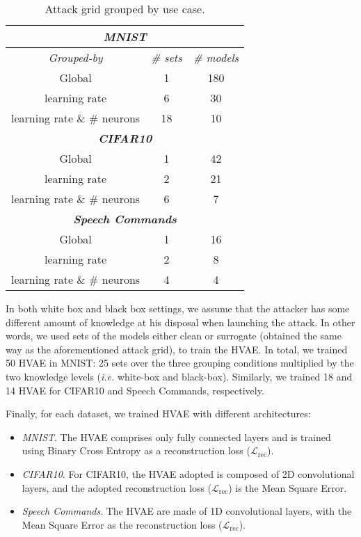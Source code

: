 \begin{table}[!htpb]
\centering
\footnotesize
\caption{Attack grid grouped by use case. }
\begin{tabular}{ccc} \toprule
\multicolumn{3}{c}{\textit{\textbf{MNIST}}} \\ \midrule
    \textit{Grouped-by} & \textit{\# sets} & \textit{\# models}\\ \hline
    Global &     1    &  180 \\
    learning rate &     6  &  30   \\
    learning rate \& $\#$ neurons &  18 &  10\\ \midrule
    \multicolumn{3}{c}{\textit{\textbf{CIFAR10}}} \\ \midrule
    Global &  1  &  42 \\
    learning rate &  2   & 21\\
    learning rate \& $\#$ neurons &    6    &   7 \\ \midrule
    \multicolumn{3}{c}{\textit{\textbf{Speech Commands}}} \\ \midrule
    Global &     1   &  16\\
    learning rate &   2  &  8 \\ 
    learning rate \& $\#$ neurons &    4   &  4  \\ \bottomrule
\end{tabular}
\label{tab.grid}
\end{table}
\par
In both white box and black box settings, we assume that the attacker has some different amount of knowledge at his disposal when launching the attack. In other words, we used sets of the models either clean or surrogate (obtained the same way as the aforementioned attack grid), to train the HVAE. In total, we trained 50 HVAE in MNIST: 25 sets over the three grouping conditions multiplied by the two knowledge levels (\textit{i.e.} white-box and black-box).
Similarly, we trained 18 and 14 HVAE for CIFAR10 and Speech Commands, respectively. 
\par
Finally, for each dataset, we trained HVAE with different architectures: 
\begin{itemize}
    \item \textit{MNIST}. The HVAE comprises only fully connected layers and is trained using Binary Cross Entropy as a reconstruction loss ($\mathcal{L}_{\mathrm{rec}}$). 
    \item \textit{CIFAR10}. For CIFAR10, the HVAE adopted is composed of 2D convolutional layers, and the adopted reconstruction loss ($\mathcal{L}_{\mathrm{rec}}$) is the Mean Square Error.
    \item \textit{Speech Commands}. The HVAE are made of 1D convolutional layers, with the Mean Square Error as the reconstruction loss ($\mathcal{L}_{\mathrm{rec}}$).
\end{itemize}

